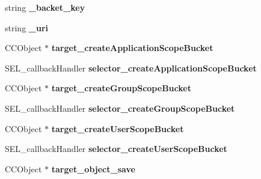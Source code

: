 \begin{DoxyCompactItemize}
\item 
\hypertarget{class_c_kii_bucket_ae62e874439f55143f8009f88da23bc99}{string {\bfseries \-\_\-backet\-\_\-key}}\label{class_c_kii_bucket_ae62e874439f55143f8009f88da23bc99}

\item 
\hypertarget{class_c_kii_bucket_aa18c6b0053f2e0a2a07c33e5dc490802}{string {\bfseries \-\_\-uri}}\label{class_c_kii_bucket_aa18c6b0053f2e0a2a07c33e5dc490802}

\item 
\hypertarget{class_c_kii_bucket_ab0a3c000da769ed033a6d2354db3221a}{C\-C\-Object $\ast$ {\bfseries target\-\_\-create\-Application\-Scope\-Bucket}}\label{class_c_kii_bucket_ab0a3c000da769ed033a6d2354db3221a}

\item 
\hypertarget{class_c_kii_bucket_a4a5b74eb7eea8c621668c2cd8a5f7cb4}{S\-E\-L\-\_\-callback\-Handler {\bfseries selector\-\_\-create\-Application\-Scope\-Bucket}}\label{class_c_kii_bucket_a4a5b74eb7eea8c621668c2cd8a5f7cb4}

\item 
\hypertarget{class_c_kii_bucket_ad36b7c5ea5bb1f578d0f24011f7af2b8}{C\-C\-Object $\ast$ {\bfseries target\-\_\-create\-Group\-Scope\-Bucket}}\label{class_c_kii_bucket_ad36b7c5ea5bb1f578d0f24011f7af2b8}

\item 
\hypertarget{class_c_kii_bucket_a0070b496c90629e11bd409d7fe28cbda}{S\-E\-L\-\_\-callback\-Handler {\bfseries selector\-\_\-create\-Group\-Scope\-Bucket}}\label{class_c_kii_bucket_a0070b496c90629e11bd409d7fe28cbda}

\item 
\hypertarget{class_c_kii_bucket_a8c191a661195354d60a8b7c0b3538e4b}{C\-C\-Object $\ast$ {\bfseries target\-\_\-create\-User\-Scope\-Bucket}}\label{class_c_kii_bucket_a8c191a661195354d60a8b7c0b3538e4b}

\item 
\hypertarget{class_c_kii_bucket_ab596059653bc65a47a98f7dfbbd3f55c}{S\-E\-L\-\_\-callback\-Handler {\bfseries selector\-\_\-create\-User\-Scope\-Bucket}}\label{class_c_kii_bucket_ab596059653bc65a47a98f7dfbbd3f55c}

\item 
\hypertarget{class_c_kii_bucket_a6f53d63ed58db2db7f10f8067d160203}{C\-C\-Object $\ast$ {\bfseries target\-\_\-object\-\_\-save}}\label{class_c_kii_bucket_a6f53d63ed58db2db7f10f8067d160203}


\end{DoxyCompactItemize}

